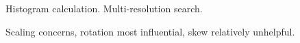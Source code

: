 %
%
%
%
%
%

%
%
%



Histogram calculation.
Multi-resolution search.

Scaling concerns, rotation most influential, skew relatively unhelpful.

